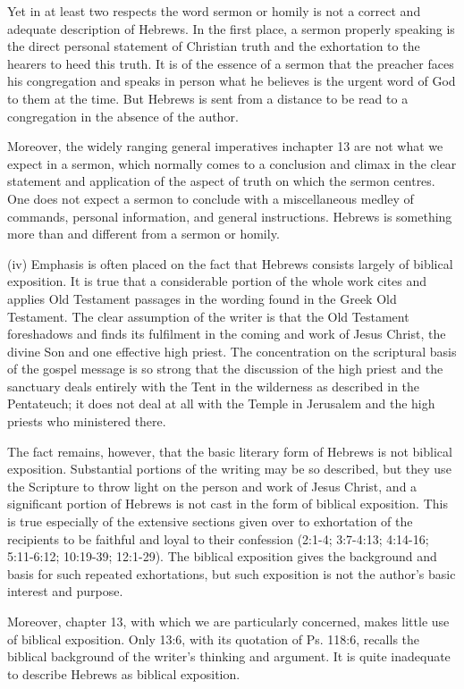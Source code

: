 Yet in at least two respects the word sermon or homily is not a correct and
adequate description of Hebrews.
In the first place, a sermon properly speaking is the direct personal statement
of Christian truth and the exhortation to the hearers to heed this truth.
It is of the essence of a sermon that the preacher faces his congregation and
speaks in person what he believes is the urgent word of God to them at the time.
But Hebrews is sent from a distance to be read to a congregation in the absence
of the author.

Moreover, the widely ranging general imperatives inchapter 13 are not what we
expect in a sermon, which normally comes to a conclusion and climax in the clear
statement and application of the aspect of truth on which the sermon centres.
One does not expect a sermon to conclude with a miscellaneous medley of
commands, personal information, and general instructions.
Hebrews is something more than and different from a sermon or homily.

(iv) Emphasis is often placed on the fact that Hebrews consists largely of
biblical exposition.
It is true that a considerable portion of the whole work cites and applies Old
Testament passages in the wording found in the Greek Old Testament.
The clear assumption of the writer is that the Old Testament foreshadows and
finds its fulfilment in the coming and work of Jesus Christ, the divine Son and
one effective high priest.
The concentration on the scriptural basis of the gospel message is so strong
that the discussion of the high priest and the sanctuary deals entirely with the
Tent in the wilderness as described in the Pentateuch; it does not deal at all
with the Temple in Jerusalem and the high priests who ministered there.

The fact remains, however, that the basic literary form of Hebrews is not
biblical exposition.
Substantial portions of the writing may be so described, but they use the
Scripture to throw light on the person and work of Jesus Christ, and a
significant portion of Hebrews is not cast in the form of biblical exposition.
This is true especially of the extensive sections given over to exhortation of
the recipients to be faithful and loyal to their confession (2:1-4; 3:7-4:13;
4:14-16; 5:11-6:12; 10:19-39; 12:1-29).
The biblical exposition gives the background and basis for such repeated
exhortations, but such exposition is not the author's basic interest and
purpose.

Moreover, chapter 13, with which we are particularly concerned, makes little use
of biblical exposition.
Only 13:6, with its quotation of Ps. 118:6, recalls the biblical background of
the writer's thinking and argument.
It is quite inadequate to describe Hebrews as biblical exposition.

